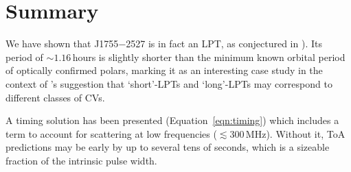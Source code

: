 \documentclass[fleqn,usenatbib]{mnras}
\newcommand{\src}{J1755$-$2527}
\newcommand{\Eqn}{Equation}
\begin{document}




\section{Summary} \label{sec:summary}

We have shown that \src{} is in fact an LPT, as conjectured in ).
Its period of ${\sim}1.16\,$hours is slightly shorter than the minimum known orbital period of optically confirmed polars, marking it as an interesting case study in the context of \citet{2025A&A...695L...8R}'s suggestion that `short'-LPTs and `long'-LPTs may correspond to different classes of CVs.

A timing solution has been presented (\Eqn~\ref{eqn:timing}) which includes a term to account for scattering at low frequencies ($\lesssim 300\,$MHz).
Without it, ToA predictions may be early by up to several tens of seconds, which is a sizeable fraction of the intrinsic pulse width.
\end{document}
